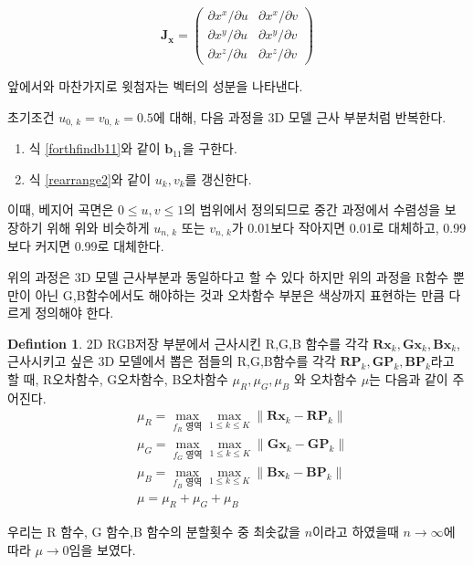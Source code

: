 \documentclass{gshs_thesis}
\theoremstyle{theorem}
\theoremstyle{lemma}
\theoremstyle{definition}
\newtheorem{definition}[theorem]{Defintion}
\begin{document}
$$ \mathbf{J}_\mathbf{x} = \begin{pmatrix} \partial x^x / \partial u & \partial x^x / \partial v \\ \partial x^y / \partial u & \partial x^y / \partial v \\ \partial x^z / \partial u & \partial x^z / \partial v \end{pmatrix} $$ 

앞에서와 마찬가지로 윗첨자는 벡터의 성분을 나타낸다.

초기조건 $u_{0, \, k} = v_{0, \, k} = 0.5$에 대해, 다음 과정을 3D 모델 근사 부분처럼 반복한다. 
\begin{enumerate}
	\item 식 \eqref{forthfindb11}와 같이 $\mathbf{b}_{11}$을 구한다. 
	\item 식 \eqref{rearrange2}와 같이 $u_k, v_k$를 갱신한다. 
\end{enumerate}

이때, 베지어 곡면은 $0 \leq u, v \leq 1$의 범위에서 정의되므로 중간 과정에서 수렴성을 보장하기 위해 위와 비슷하게 $u_{n, \, k}$ 또는 $v_{n, \, k}$가 0.01보다 작아지면 0.01로 대체하고, 0.99보다 커지면 0.99로 대체한다. 

위의 과정은 3D 모델 근사부분과 동일하다고 할 수 있다 하지만 위의 과정을 R함수 뿐만이 아닌 G,B함수에서도 해야하는 것과 오차함수 부분은 색상까지 표현하는 만큼 다르게 정의해야 한다.
\begin{definition}
	2D RGB저장 부분에서 근사시킨 R,G,B 함수를 각각 $\mathbf{Rx}_k,\mathbf{Gx}_k,\mathbf{Bx}_k$, 근사시키고 싶은 3D 모델에서 뽑은 점들의 R,G,B함수를 각각 $\mathbf{RP}_k,\mathbf{GP}_k,\mathbf{BP}_k$라고 할 때, R오차함수, G오차함수, B오차함수 $\mu_{R},\mu_{G},\mu_{B}$ 와 오차함수 $\mu$는 다음과 같이 주어진다.
	\begin{equation} \label{2D RGB error}
		\begin{split}
		&\mu_{R}=\max_{\text{$f_{R}$ 영역}}\max_{1\leq k\leq K} \| \mathbf{Rx}_k-\mathbf{RP}_k\| \\
		&\mu_{G}=\max_{\text{$f_{G}$ 영역}}\max_{1\leq k\leq K} \| \mathbf{Gx}_k-\mathbf{GP}_k\| \\
		&\mu_{B}=\max_{\text{$f_{B}$ 영역}}\max_{1\leq k\leq K} \| \mathbf{Bx}_k-\mathbf{BP}_k\| \\
		&\mu=\mu_{R}+\mu_{G}+\mu_{B}
		\end{split}
	\end{equation}
\end{definition}


우리는 R 함수, G 함수,B 함수의 분할횟수 중 최솟값을 $n$이라고 하였을때 $n\to\infty$에 따라 $\mu\to0$임을 보였다. 
\end{document}
